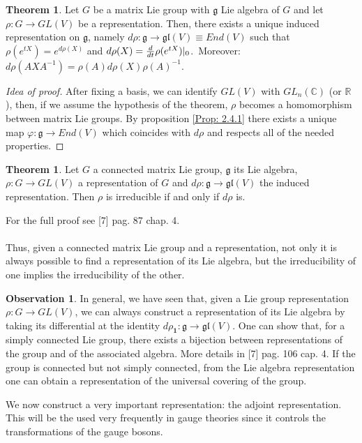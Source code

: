 \documentclass[12pt,a4paper]{report}
\theoremstyle{definition}
\theoremstyle{Theorem}
\newtheorem{Theo}[Def]{Theorem}
\theoremstyle{definition}
\theoremstyle{definition}
\newtheorem{Obs}[Def]{Observation}
\begin{document}
	\begin{Theo}
		Let $G$ be a matrix Lie group with $\mathfrak{g}$ Lie algebra of $G$ and let $\rho:G\rightarrow GL(V)$ be a representation. Then, there exists a unique induced representation on $\mathfrak{g}$, namely $d\rho:\mathfrak{g}\rightarrow \mathfrak{gl}(V)\equiv End(V)$ such that $\rho(e^{tX})=e^{d\rho(X)}$ and $d\rho(X)={d\over dt}\rho(e^{tX})|_0$.\
		Moreover: $d\rho(AXA^{-1})=\rho(A)d\rho(X)\rho(A)^{-1}$.	
	\end{Theo}
	\begin{proof} [Idea of proof]
		After fixing a basis, we can identify $GL(V)$ with $GL_n(\mathbb{C})$ (or $\mathbb{R}$), then, if we assume the hypothesis of the theorem, $\rho$ becomes a homomorphism between matrix Lie groups. By proposition \ref{Prop: 2.4.1} there exists a unique map $\varphi:\mathfrak{g}\rightarrow End(V)$ which coincides with $d\rho$ and respects all of the needed properties.
	\end{proof}
	\begin{Theo}\label{Theo: 3.1}
		Let $G$ a connected matrix Lie group, $\mathfrak{g}$ its Lie algebra, $\rho:G\rightarrow GL(V)$ a representation of $G$ and $d\rho:\mathfrak{g}\rightarrow \mathfrak{gl}(V)$ the induced representation. Then $\rho$ is irreducible if and only if $d\rho$ is.
	\end{Theo}
	For the full proof see [7] pag. 87 chap. 4.\\
	\\
	Thus, given a connected matrix Lie group and a representation, not only it is always possible to find a representation of its Lie algebra, but the irreducibility of one implies the irreducibility of the other.
	\begin{Obs}
		In general, we have seen that, given a Lie group representation $\rho:G\rightarrow GL(V)$, we can always construct a representation of its Lie algebra by taking its differential at the identity $d\rho_\textbf{1}:\mathfrak{g}\rightarrow \mathfrak{gl}(V)$. One can show that, for a simply connected Lie group, there exists a bijection between representations of the group and of the associated algebra. More details in [7] pag. 106 cap. 4. If the group is connected but not simply connected, from the Lie algebra representation one can obtain a representation of the universal covering of the group.
	\end{Obs}
	We now construct a very important representation: the adjoint representation. This will be the used very frequently in gauge theories since it controls the transformations of the gauge bosons.
\end{document}
